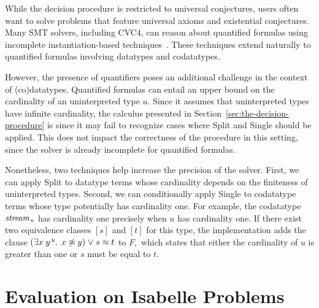 \documentclass[smallcondensed,draft]{svjour3}
\newcommand\typ[1]{^{\vthinspace #1}}
\newcommand\ty[1]{\textit{#1}}
\newcommand{\rn}[1]{\textsf{#1}}
\newcommand{\teq}{\approx}
\newcommand{\ec}[1]{[#1]}
\newcommand\vthinspace{\kern+0.083333em}
\begin{document}
While the decision procedure is restricted to universal conjectures, users often
want to solve problems that feature universal axioms and existential
conjectures.
Many SMT solvers, including CVC4, can reason about quantified formulas using incomplete
instantiation-based
techniques~\cite{MouraBjoerner07,ReynoldsTinelliMoura14}.
These techniques extend naturally to quantified
formulas involving datatypes and codatatypes.

However, the presence of quantifiers poses an additional challenge in
the context of (co)datatypes. Quantified formulas can entail an upper bound on
the cardinality of an uninterpreted type $\ty{u}.$
Since it assumes that uninterpreted types have infinite cardinality, the calculus
presented in Section~\ref{sec:the-decision-procedure} is 
since it may fail to recognize cases where \rn{Split} and \rn{Single} should be
applied.
This does not %
impact the correctness of the procedure in this setting,
since %
the solver is already incomplete for quantified formulas.

Nonetheless, two techniques help increase the precision of the solver.
First, we can apply \rn{Split} to datatype terms whose cardinality depends on the finiteness of
uninterpreted types.
Second, we can conditionally apply \rn{Single} to codatatype terms whose type
potentially has cardinality one.
For example, the codatatype $\ty{stream}_{\vthinspace\ty{u}}$ %
has cardinality one precisely when $\ty{u}$ has cardinality one.
If there exist two equivalence classes $\ec{s}$ and $\ec{t}$ for this type,
the implementation adds the clause %
$(\exists x\;y\typ{\ty{u}}.\;\, x \not\teq y ) \mathrel\vee s \teq t$ to $F\!,$
which states that either the cardinality of $\ty{u}$ is greater than one or
$s$ must be equal to $t.$


\section{Evaluation on Isabelle Problems}
\label{sec:evaluation-on-isabelle-problems}
\end{document}
